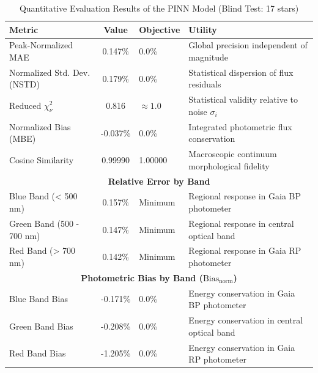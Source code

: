 
\begin{table}[htpb]
\centering
\caption{Quantitative Evaluation Results of the PINN Model (Blind Test: 17 stars)}
\label{tab:pinn_evaluation}
\begin{tabular}{lcll}
\hline
\textbf{Metric} & \textbf{Value} & \textbf{Objective} & \textbf{Utility} \\
\hline
Peak-Normalized MAE & 0.147\% & 0.0\% & Global precision independent of magnitude \\
Normalized Std. Dev. (NSTD) & 0.179\% & 0.0\% & Statistical dispersion of flux residuals \\
Reduced $\chi^2_\nu$ & 0.816 & $\approx 1.0$ & Statistical validity relative to noise $\sigma_i$ \\
Normalized Bias (MBE) & -0.037\% & 0.0\% & Integrated photometric flux conservation \\
Cosine Similarity & 0.99990 & 1.00000 & Macroscopic continuum morphological fidelity \\
\hline
\multicolumn{4}{c}{\textbf{Relative Error by Band}} \\
\hline
Blue Band (< 500 nm) & 0.157\% & Minimum & Regional response in Gaia BP photometer \\
Green Band (500 - 700 nm) & 0.147\% & Minimum & Regional response in central optical band \\
Red Band (> 700 nm) & 0.142\% & Minimum & Regional response in Gaia RP photometer \\
\hline
\multicolumn{4}{c}{\textbf{Photometric Bias by Band ($\text{Bias}_{\text{norm}}$)}} \\
\hline
Blue Band Bias & -0.171\% & 0.0\% & Energy conservation in Gaia BP photometer \\
Green Band Bias & -0.208\% & 0.0\% & Energy conservation in central optical band \\
Red Band Bias & -1.205\% & 0.0\% & Energy conservation in Gaia RP photometer \\
\hline
\end{tabular}
\end{table}

